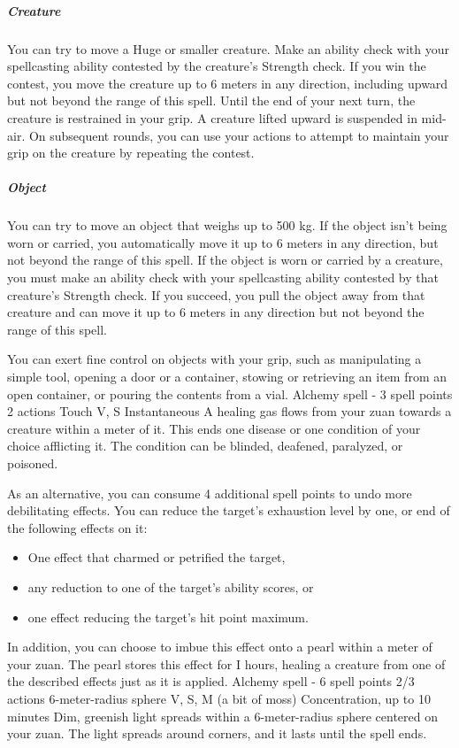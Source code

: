    \subparagraph{Creature}
    You can try to move a Huge or smaller creature.
    Make an ability check with your spellcasting ability contested by the creature's Strength check.
    If you win the contest, you move the creature up to 6 meters in any direction, including upward but not beyond the range of this spell.
    Until the end of your next turn, the creature is restrained in your grip.
    A creature lifted upward is suspended in mid-air.
    On subsequent rounds, you can use your actions to attempt to maintain your grip on the creature by repeating the contest.

    \subparagraph{Object}
    You can try to move an object that weighs up to 500 kg.
    If the object isn't being worn or carried, you automatically move it up to 6 meters in any direction, but not beyond the range of this spell.
    If the object is worn or carried by a creature, you must make an ability check with your spellcasting ability contested by that creature's Strength check.
    If you succeed, you pull the object away from that creature and can move it up to 6 meters in any direction but not beyond the range of this spell.

    You can exert fine control on objects with your grip, such as manipulating a simple tool, opening a door or a container, stowing or retrieving an item from an open container, or pouring the contents from a vial.
    {Alchemy spell - 3 spell points}
    {2 actions}
    {Touch}
    {V, S}
    {Instantaneous}
    A healing gas flows from your zuan towards a creature within a meter of it.
    This ends one disease or one condition of your choice afflicting it.
    The condition can be blinded, deafened, paralyzed, or poisoned.

    As an alternative, you can consume 4 additional spell points to undo more debilitating effects.
    You can reduce the target's exhaustion level by one, or end of the following effects on it:
    \begin{itemize}
        \item One effect that charmed or petrified the target,
        \item any reduction to one of the target's ability scores, or
        \item one effect reducing the target's hit point maximum.
    \end{itemize}

    In addition, you can choose to imbue this effect onto a pearl within a meter of your zuan.
    The pearl stores this effect for I hours, healing a creature from one of the described effects just as it is applied.
    {Alchemy spell - 6 spell points}
    {2/3 actions}
    {6-meter-radius sphere}
    {V, S, M (a bit of moss)}
    {Concentration, up to 10 minutes}
    Dim, greenish light spreads within a 6-meter-radius sphere centered on your zuan.
    The light spreads around corners, and it lasts until the spell ends.

